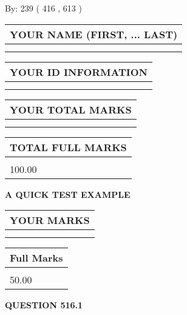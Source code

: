 \documentclass[12pt]{article}
\begin{document}
   
\hspace{1.0in} By: 
 239 ( 416 ,  613 )
   
   
   
   
\newpage 
\setcounter{page}{ 
   516001 } 
   
   
   
   
\noindent\begin{tabular}{|l|}
\hline
YOUR NAME (FIRST, ... LAST)  \\
\hline
 \\ 
 \\ 
\hline
\end{tabular}
\hspace{0.05in} \begin{tabular}{|l|}
\hline
 YOUR   ID   INFORMATION  \\
\hline
 \\ 
 \\ 
\hline
\end{tabular}
   
   
\vspace{0.2in}\noindent\begin{tabular}{|l|}
\hline
YOUR TOTAL MARKS  \\
\hline
 \\ 
 \\ 
\hline
\end{tabular}
\hspace{0.05in} \begin{tabular}{|l|}
\hline
TOTAL FULL MARKS  \\
\hline
 \\ 
100.00 \\
\hline
\end{tabular}
   
   
 \vspace{0.2in}
{\LARGE {\textbf{ A QUICK TEST EXAMPLE}}}
   
   
  
\vspace{0.2in}
  
\noindent\begin{tabular}{|l|}
\hline
 YOUR MARKS  \\
\hline
 \\ 
 \\ 
\hline
\end{tabular}
\hspace{0.05in} \begin{tabular}{|l|}
\hline
 Full Marks  \\
\hline
 \\ 
50.00 \\
\hline
\end{tabular}
{\textbf{\Large{QUESTION
516.1 
}}}
  
\end{document}
